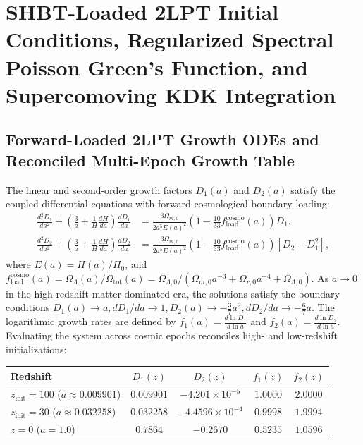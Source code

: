\documentclass[11pt,letterpaper]{article}
\theoremstyle{plain}
\begin{document}
\section{SHBT-Loaded 2LPT Initial Conditions, Regularized Spectral Poisson Green's Function, and Supercomoving KDK Integration}

\subsection{Forward-Loaded 2LPT Growth ODEs and Reconciled Multi-Epoch Growth Table}
The linear and second-order growth factors $D_1(a)$ and $D_2(a)$ satisfy the coupled differential equations with forward cosmological boundary loading:
\begin{align}
    \frac{d^2 D_1}{d a^2} + \left(\frac{3}{a} + \frac{1}{H} \frac{dH}{da}\right)\frac{d D_1}{da} &= \frac{3 \Omega_{m,0}}{2 a^5 E(a)^2}\left(1 - \frac{10}{33} f_{\mathrm{load}}^{\mathrm{cosmo}}(a)\right) D_1, \label{eq:d1_ode_main} \\
    \frac{d^2 D_2}{d a^2} + \left(\frac{3}{a} + \frac{1}{H} \frac{dH}{da}\right)\frac{d D_2}{da} &= \frac{3 \Omega_{m,0}}{2 a^5 E(a)^2}\left(1 - \frac{10}{33} f_{\mathrm{load}}^{\mathrm{cosmo}}(a)\right) \left[ D_2 - D_1^2 \right], \label{eq:d2_ode_main}
\end{align}
where $E(a) = H(a)/H_0$, and $f_{\mathrm{load}}^{\mathrm{cosmo}}(a) = \Omega_\Lambda(a)/\Omega_{\mathrm{tot}}(a) = \Omega_{\Lambda,0}/(\Omega_{m,0} a^{-3} + \Omega_{r,0} a^{-4} + \Omega_{\Lambda,0})$. As $a \to 0$ in the high-redshift matter-dominated era, the solutions satisfy the boundary conditions $D_1(a) \to a, dD_1/da \to 1, D_2(a) \to -\frac{3}{7}a^2, dD_2/da \to -\frac{6}{7}a$.
The logarithmic growth rates are defined by $f_1(a) = \frac{d\ln D_1}{d\ln a}$ and $f_2(a) = \frac{d\ln D_2}{d\ln a}$.
Evaluating the system across cosmic epochs reconciles high- and low-redshift initializations:
\begin{center}
\begin{tabular}{lcccc}
\hline\hline
Redshift & $D_1(z)$ & $D_2(z)$ & $f_1(z)$ & $f_2(z)$ \\
\hline
$z_{\mathrm{init}} = 100$ ($a \approx 0.009901$) & $0.009901$ & $-4.201 \times 10^{-5}$ & $1.0000$ & $2.0000$ \\
$z_{\mathrm{init}} = 30$ ($a \approx 0.032258$) & $0.032258$ & $-4.4596 \times 10^{-4}$ & $0.9998$ & $1.9994$ \\
$z = 0$ ($a = 1.0$) & $0.7864$ & $-0.2670$ & $0.5235$ & $1.0596$ \\
\hline\hline
\end{tabular}
\end{center}
\end{document}

